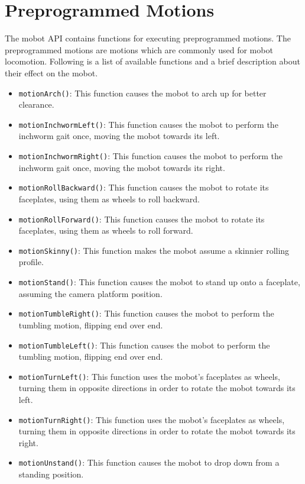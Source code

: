 \documentclass{article}
\begin{document}
\section{\label{sec:preprogrammed_motions}Preprogrammed Motions}
The mobot API contains functions for executing preprogrammed motions. The 
preprogrammed motions are motions which are commonly used for mobot locomotion.
Following is a list of available functions and a brief description about
their effect on the mobot.
\begin{itemize}
\item \texttt{motionArch()}: This function causes the mobot to arch up for better 
clearance.
\item \texttt{motionInchwormLeft()}: This function causes the mobot to perform
  the inchworm gait once, moving the mobot towards its left.
\item \texttt{motionInchwormRight()}: This function causes the mobot to perform
  the inchworm gait once, moving the mobot towards its right.
\item \texttt{motionRollBackward()}: This function causes the mobot to rotate
  its faceplates, using them as wheels to roll backward.
\item \texttt{motionRollForward()}: This function causes the mobot to rotate
  its faceplates, using them as wheels to roll forward.
\item \texttt{motionSkinny()}: This function makes the mobot assume a skinnier
rolling profile.
\item \texttt{motionStand()}: This function causes the mobot to stand up onto a 
  faceplate, assuming the camera platform position.
\item \texttt{motionTumbleRight()}: This function causes the mobot to perform the
tumbling motion, flipping end over end.
\item \texttt{motionTumbleLeft()}: This function causes the mobot to perform the
tumbling motion, flipping end over end.
\item \texttt{motionTurnLeft()}: This function uses the mobot's faceplates as wheels, turning
  them in opposite directions in order to rotate the mobot towards its left.
\item \texttt{motionTurnRight()}: This function uses the mobot's faceplates as wheels, turning
  them in opposite directions in order to rotate the mobot towards its right.
\item \texttt{motionUnstand()}: This function causes the mobot to drop down from a standing position.
\end{itemize}
\end{document}
